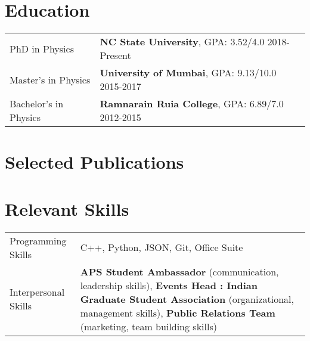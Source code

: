 \documentclass[a4paper,12pt]{article}
\begin{document}
\section{Education}
\begin{tabularx}{\linewidth}{@{}l X@{}}	
PhD in Physics & \textbf{NC State University}, GPA: 3.52/4.0 \hfill 2018-Present \\
Master's in Physics & \textbf{University of Mumbai}, GPA: 9.13/10.0 \hfill 2015-2017 \\ 
Bachelor's in Physics & \textbf{Ramnarain Ruia College}, GPA: 6.89/7.0 \hfill  2012-2015 \\

\end{tabularx}

\section{Selected Publications}
\begin{refsection}
\nocite{*}
\printbibliography[heading=none]
\end{refsection}

\section{Relevant Skills}
\begin{tabularx}{\linewidth}{@{}l X@{}}
Programming Skills &  \normalsize{C++, Python, JSON, Git, Office Suite}\\
Interpersonal Skills  &  \normalsize{\textbf{APS Student Ambassador} (communication, leadership skills), \newline \textbf{Events Head : Indian Graduate Student Association} (organizational, management skills), \textbf{Public Relations Team} (marketing, team building skills)}\\
\end{tabularx}

\vfill
\end{document}

